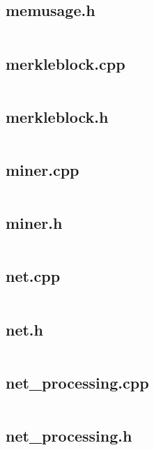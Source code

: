 \documentclass{article}
\begin{document}
\subsection{memusage.h}
\inputminted{cpp}{/home/dufferzafar/dev/@clones/bitcoin/src/memusage.h}
\newpage

\subsection{merkleblock.cpp}
\inputminted{cpp}{/home/dufferzafar/dev/@clones/bitcoin/src/merkleblock.cpp}
\newpage

\subsection{merkleblock.h}
\inputminted{cpp}{/home/dufferzafar/dev/@clones/bitcoin/src/merkleblock.h}
\newpage

\subsection{miner.cpp}
\inputminted{cpp}{/home/dufferzafar/dev/@clones/bitcoin/src/miner.cpp}
\newpage

\subsection{miner.h}
\inputminted{cpp}{/home/dufferzafar/dev/@clones/bitcoin/src/miner.h}
\newpage

\subsection{net.cpp}
\inputminted{cpp}{/home/dufferzafar/dev/@clones/bitcoin/src/net.cpp}
\newpage

\subsection{net.h}
\inputminted{cpp}{/home/dufferzafar/dev/@clones/bitcoin/src/net.h}
\newpage

\subsection{net\_processing.cpp}
\inputminted{cpp}{/home/dufferzafar/dev/@clones/bitcoin/src/net_processing.cpp}
\newpage

\subsection{net\_processing.h}
\inputminted{cpp}{/home/dufferzafar/dev/@clones/bitcoin/src/net_processing.h}
\newpage
\end{document}
